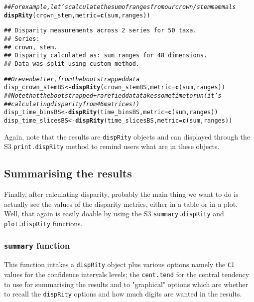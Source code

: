 \documentclass{article}\usepackage[]{graphicx}\usepackage[]{color}
\makeatletter
\newcommand{\hlcom}[1]{\textcolor[rgb]{0.678,0.584,0.686}{\textit{#1}}}%
\newcommand{\hlstd}[1]{\textcolor[rgb]{0.345,0.345,0.345}{#1}}%
\newcommand{\hlkwb}[1]{\textcolor[rgb]{0.69,0.353,0.396}{#1}}%
\newcommand{\hlkwc}[1]{\textcolor[rgb]{0.333,0.667,0.333}{#1}}%
\newcommand{\hlkwd}[1]{\textcolor[rgb]{0.737,0.353,0.396}{\textbf{#1}}}%
\newenvironment{kframe}{%
 \def\at@end@of@kframe{}%
 \ifinner\ifhmode%
  \def\at@end@of@kframe{\end{minipage}}%
  \begin{minipage}{\columnwidth}%
 \fi\fi%
 \def\FrameCommand##1{\hskip\@totalleftmargin \hskip-\fboxsep
 \colorbox{shadecolor}{##1}\hskip-\fboxsep
     \hskip-\linewidth \hskip-\@totalleftmargin \hskip\columnwidth}%
 \MakeFramed {\advance\hsize-\width
   \@totalleftmargin\z@ \linewidth\hsize
   \@setminipage}}%
 {\par\unskip\endMakeFramed%
 \at@end@of@kframe}
\newenvironment{knitrout}{}{} %
\newcommand{\dispRity}{\texttt{dispRity} }
\makeatother
\begin{document}
\begin{knitrout}
\color{fgcolor}\begin{kframe}
\begin{alltt}
\hlcom{## For example, let's calculate the sum of ranges from our crown/stem mammals}
\hlkwd{dispRity}\hlstd{(crown_stem,} \hlkwc{metric} \hlstd{=} \hlkwd{c}\hlstd{(sum, ranges))}
\end{alltt}
\begin{verbatim}
## Disparity measurements across 2 series for 50 taxa. 
## Series:
## crown, stem.
## Disparity calculated as: sum ranges for 48 dimensions.
## Data was split using custom method.
\end{verbatim}
\begin{alltt}
\hlcom{## Or even better, from the bootstrapped data}
\hlstd{disp_crown_stemBS} \hlkwb{<-} \hlkwd{dispRity}\hlstd{(crown_stemBS,} \hlkwc{metric} \hlstd{=} \hlkwd{c}\hlstd{(sum, ranges))}
\hlcom{## Note that the bootstrapped + rarefied data takes some time to run (it's}
\hlcom{## calculating disparity from 46 matrices!)}
\hlstd{disp_time_binsBS} \hlkwb{<-} \hlkwd{dispRity}\hlstd{(time_binsBS,} \hlkwc{metric} \hlstd{=} \hlkwd{c}\hlstd{(sum, ranges))}
\hlstd{disp_time_slicesBS} \hlkwb{<-} \hlkwd{dispRity}\hlstd{(time_slicesBS,} \hlkwc{metric} \hlstd{=} \hlkwd{c}\hlstd{(sum, ranges))}
\end{alltt}
\end{kframe}
\end{knitrout}

Again, note that the results are \dispRity objects and can displayed through the S3 \texttt{print.dispRity} method to remind users what are in these objects.

\subsection{Summarising the results}
Finally, after calculating disparity, probably the main thing we want to do is actually see the values of the disparity metrics, either in a table or in a plot.
Well, that again is easily doable by using the S3 \texttt{summary.dispRity} and \texttt{plot.dispRity} functions.

\subsubsection{\texttt{summary} function}
This function intakes a \dispRity object plus various options namely the \texttt{CI} values for the confidence intervals levels; the \texttt{cent.tend} for the central tendency to use for summarising the results and to "graphical" options which are whether to recall the \dispRity options and how much digits are wanted in the results.
\end{document}
